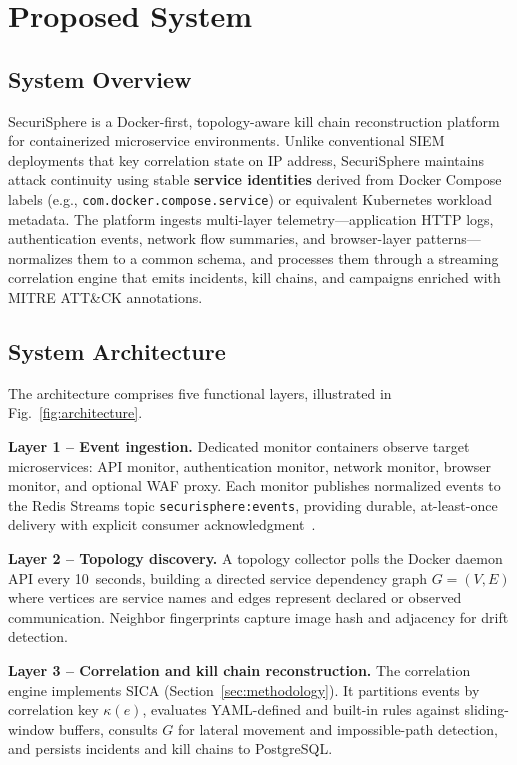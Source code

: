 \documentclass[conference]{IEEEtran}
\begin{document}
\section{Proposed System}
\label{sec:proposed}

\subsection{System Overview}
SecuriSphere is a Docker-first, topology-aware kill chain reconstruction
platform for containerized microservice environments. Unlike conventional
SIEM deployments that key correlation state on IP address, SecuriSphere
maintains attack continuity using stable \textbf{service identities}
derived from Docker Compose labels (e.g.,
\texttt{com.docker.compose.service}) or equivalent Kubernetes workload
metadata. The platform ingests multi-layer telemetry---application HTTP
logs, authentication events, network flow summaries, and browser-layer
patterns---normalizes them to a common schema, and processes them through
a streaming correlation engine that emits incidents, kill chains, and
campaigns enriched with MITRE ATT\&CK annotations.

\subsection{System Architecture}
The architecture comprises five functional layers, illustrated in
Fig.~\ref{fig:architecture}.

\textbf{Layer 1 -- Event ingestion.}
Dedicated monitor containers observe target microservices: API monitor,
authentication monitor, network monitor, browser monitor, and optional
WAF proxy. Each monitor publishes normalized events to the Redis Streams
topic \texttt{securisphere:events}, providing durable, at-least-once
delivery with explicit consumer acknowledgment~\cite{zaharia2013spark}.

\textbf{Layer 2 -- Topology discovery.}
A topology collector polls the Docker daemon API every 10~seconds, building
a directed service dependency graph $G=(V,E)$ where vertices are service
names and edges represent declared or observed communication. Neighbor
fingerprints capture image hash and adjacency for drift detection.

\textbf{Layer 3 -- Correlation and kill chain reconstruction.}
The correlation engine implements SICA (Section~\ref{sec:methodology}).
It partitions events by correlation key $\kappa(e)$, evaluates YAML-defined
and built-in rules against sliding-window buffers, consults $G$ for lateral
movement and impossible-path detection, and persists incidents and kill
chains to PostgreSQL.
\end{document}

